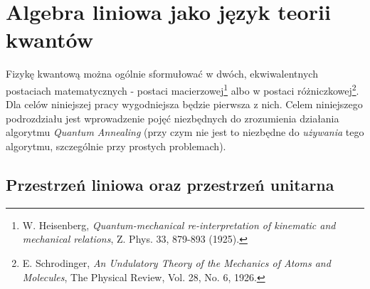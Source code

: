 \documentclass[12pt,a4paper,twoside,openany]{book}
\begin{document}
\section{Algebra liniowa jako język teorii kwantów}

Fizykę kwantową można ogólnie sformułować w dwóch, ekwiwalentnych postaciach matematycznych - postaci macierzowej\footnote{W. Heisenberg, \textit{Quantum-mechanical re-interpretation of kinematic and mechanical relations}, Z. Phys. 33, 879-893 (1925).} albo w postaci różniczkowej\footnote{E.  Schrodinger, \textit{An Undulatory Theory of the Mechanics of Atoms and Molecules}, The Physical Review, Vol. 28, No. 6, 1926.}. Dla celów niniejszej pracy wygodniejsza będzie pierwsza z nich. Celem niniejszego podrozdziału jest wprowadzenie pojęć niezbędnych do zrozumienia działania algorytmu \textit{Quantum Annealing} (przy czym nie jest to niezbędne do \textit{używania} tego algorytmu, szczególnie przy prostych problemach). 

\subsection{Przestrzeń liniowa oraz przestrzeń unitarna}
\end{document}
